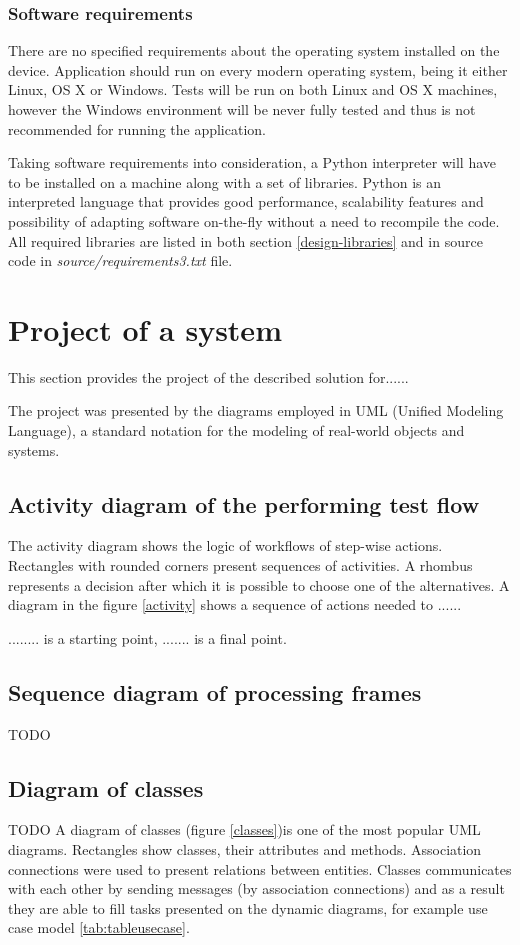\subsubsection{Software requirements}
There are no specified requirements about the operating system installed on the device. Application should run on every modern operating system, being it either Linux, OS X or Windows. Tests will be run on both Linux and OS X machines, however the Windows environment will be never fully tested and thus is not recommended for running the application.

Taking software requirements into consideration, a Python interpreter will have to be installed on a machine along with a set of libraries. Python is an interpreted language that provides good performance, scalability features and possibility of adapting software on-the-fly without a need to recompile the code. All required libraries are listed in both section \ref{design-libraries} and in source code in \textit{source/requirements3.txt} file.
 
 
\section{Project of a system} \label{project}
This section provides the project of the described solution for......

 The project was presented by the diagrams employed in UML (Unified Modeling Language), a standard notation for the modeling of real-world objects and systems. 
 
\subsection{Activity diagram of the performing test flow}
The activity diagram shows the logic of workflows of step-wise actions. Rectangles with rounded corners present sequences of activities. A rhombus represents a decision after which it is possible to choose one of the alternatives. A diagram in the figure \ref{activity} shows a sequence of actions needed to ......

........ is a starting point, ....... is a final point. 


\subsection{Sequence diagram of processing frames}
TODO



\subsection{Diagram of classes}
TODO
A diagram of classes (figure \ref{classes})is one of the most popular UML diagrams. Rectangles show classes, their attributes and methods. Association connections were used to present relations between entities. Classes communicates with each other by sending messages (by association connections) and as a result they are able to fill tasks presented on the dynamic diagrams, for example use case model \ref{tab:tableusecase}.

